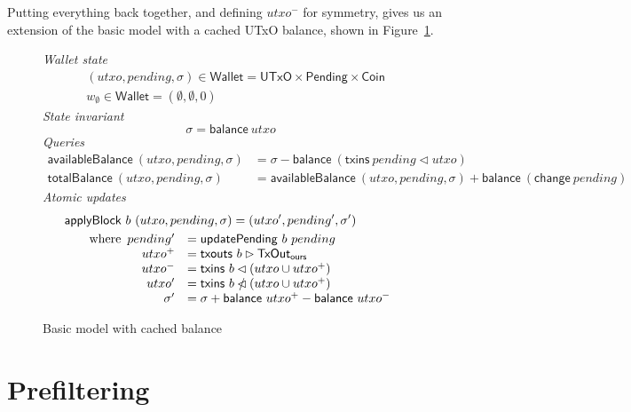 \documentclass{article}
\newcommand{\restrictdom}{\lhd}
\newcommand{\subtractdom}{\mathbin{\slashed{\restrictdom}}}
\newcommand{\restrictrange}{\rhd}
\numberwithin{equation}{lemma}
\begin{document}
Putting everything back together, and defining $utxo^-$ for symmetry, gives
us an extension of the basic model with a cached UTxO balance, shown
in Figure~\ref{fig:model_with_cached_balance}.

\begin{figure}[p]
%
\emph{Wallet state}
%
\begin{align*}
& (\mathit{utxo}, \mathit{pending}, \sigma) \in \mathsf{Wallet} = \mathsf{UTxO} \times \mathsf{Pending} \times \mathsf{Coin} \\
& w_\emptyset \in \mathsf{Wallet} = (\emptyset, \emptyset, 0)
\end{align*}
%
\emph{State invariant}
%
\begin{equation*}
\sigma = \mathsf{balance} ~ \mathit{utxo}
\end{equation*}
%
\emph{Queries}
%
\begin{align*}
  \mathsf{availableBalance} ~ (\mathit{utxo}, \mathit{pending}, \sigma)
& = \sigma - \mathsf{balance} ~ (\mathsf{txins} ~ pending \restrictdom utxo) \\
  \mathsf{totalBalance} ~ (\mathit{utxo}, \mathit{pending}, \sigma)
& = \mathsf{availableBalance} ~ (\mathit{utxo}, \mathit{pending}, \sigma) + \mathsf{balance} ~ (\mathsf{change} ~ pending)
\end{align*}
%
\emph{Atomic updates}
%
\begin{align*}
& \mathsf{applyBlock} ~ b ~ (utxo, pending, \sigma) = (utxo^\prime, pending^\prime, \sigma^\prime) \\
& \qquad \text{where}
  \begin{array}[t]{rl}
    pending^\prime & = \mathsf{updatePending} ~ b ~ pending \\
    utxo^+ & = \mathsf{txouts} ~ b \restrictrange \mathsf{TxOut_{ours}} \\
    utxo^- & = \mathsf{txins} ~ b \restrictdom (utxo \cup utxo^+) \\
    utxo^\prime & = \mathsf{txins} ~ b \subtractdom (utxo \cup utxo^+) \\
    \sigma^\prime & = \sigma + \mathsf{balance} ~ utxo^+ - \mathsf{balance} ~ utxo^-
  \end{array}
\end{align*}
%
\caption{\label{fig:model_with_cached_balance}Basic model with cached balance}
\end{figure}

\section{Prefiltering}
\label{sec:prefiltering}
\end{document}
